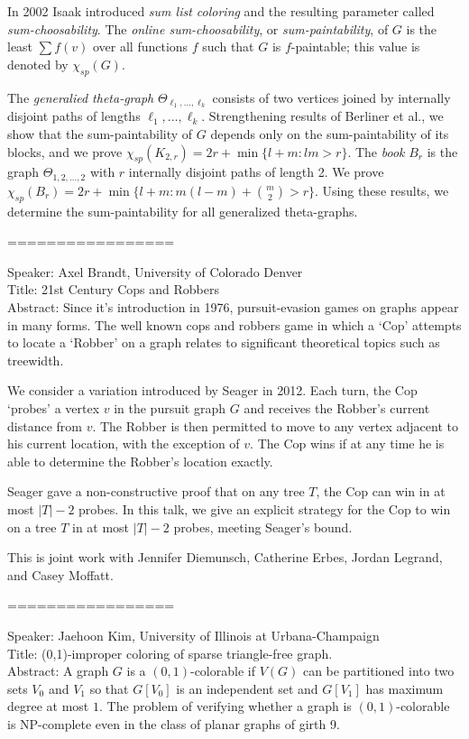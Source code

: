 \documentclass[11pt]{article}
\begin{document}
In 2002 Isaak introduced \textit{sum list coloring} and the resulting parameter called \textit{sum-choosability}. The \textit{online sum-choosability}, or \textit{sum-paintability}, of $G$  is the least $\sum f(v)$ over all functions $f$ such that $G$ is $f$-paintable; this value is denoted by $\chi_{sp}(G)$.

The \textit{generalied theta-graph} $\Theta_{\ell_1,\dots,\ell_k}$ consists of two vertices joined by internally disjoint paths of lengths $\ell_1,\dots,\ell_k$.
Strengthening results of Berliner et al., we show that the sum-paintability of $G$ depends only on the sum-paintability of its blocks, and we prove $\chi_{sp}(K_{2,r})=2r+\min\{ l + m : lm>r \}$.
The \textit{book} $B_r$ is the graph $\Theta_{1,2,\dots,2}$ with $r$ internally disjoint paths of length 2. We prove $\chi_{sp}(B_r)=2r+\min\{ l + m : m(l-m)+\binom{m}{2} > r \}$.
Using these results, we determine the sum-paintability for all generalized theta-graphs.

=================



Speaker: Axel Brandt, University of Colorado Denver\\
Title: 21st Century Cops and Robbers\\
Abstract: Since it's introduction in 1976, pursuit-evasion games on graphs appear in many forms. The well known cops and robbers game in which a `Cop' attempts to locate a `Robber' on a graph relates to significant theoretical topics such as treewidth.

We consider a variation introduced by Seager in 2012. Each turn, the Cop `probes' a vertex $v$ in the pursuit graph $G$ and receives the Robber's current distance from $v$. The Robber is then permitted to move to any vertex adjacent to his current location, with the exception of $v$. The Cop wins if at any time he is able to determine the Robber's location exactly.

Seager gave a non-constructive proof that on any tree $T$, the Cop can win in at most $|T|-2$ probes. In this talk, we give an explicit strategy for the Cop to win on a tree $T$ in at most $|T|-2$ probes, meeting Seager's bound.

This is joint work with Jennifer Diemunsch, Catherine Erbes, Jordan Legrand, and Casey Moffatt.

=================



Speaker: Jaehoon Kim, University of Illinois at Urbana-Champaign\\
Title: (0,1)-improper coloring of sparse triangle-free graph.\\
Abstract: A graph $G$ is a $(0,1)$-colorable if $V(G)$ can be partitioned into two sets $V_0$ and $V_1$ so that $G[V_0]$ is an independent set and $G[V_1]$ has maximum degree at most $1$. The problem of verifying whether a graph is $(0,1)$-colorable is NP-complete even in the class of planar graphs of girth 9.
\end{document}
